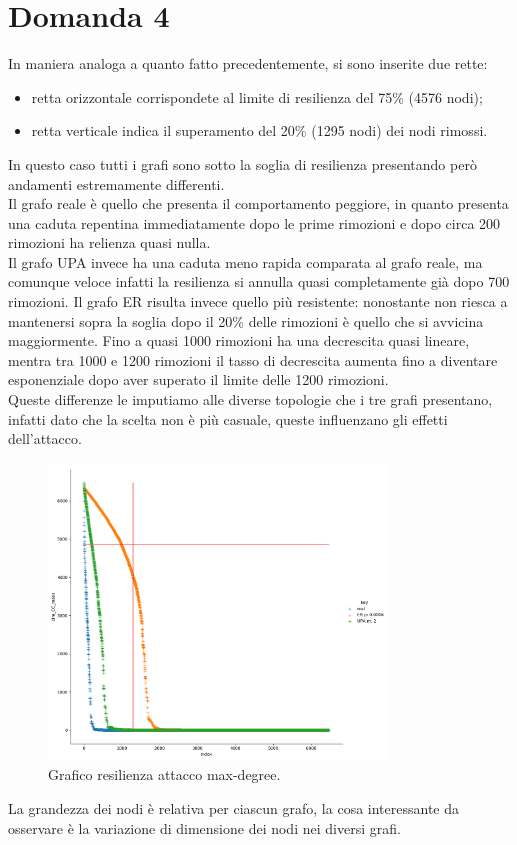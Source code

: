 \documentclass{article}
\begin{document}
\section*{Domanda 4}
In maniera analoga a quanto fatto precedentemente, si sono inserite due rette:
\begin{itemize}
	\item retta orizzontale corrispondete al limite di resilienza del 75\% (4576 nodi);
	\item retta verticale indica il superamento del 20\% (1295 nodi) dei nodi rimossi. 
\end{itemize}
In questo caso tutti i grafi sono sotto la soglia di resilienza presentando però andamenti estremamente differenti.\\
Il grafo reale è quello che presenta il comportamento peggiore, in quanto presenta una caduta repentina immediatamente dopo le prime rimozioni e dopo circa 200 rimozioni ha relienza quasi nulla.\\
Il grafo UPA invece ha una caduta meno rapida comparata al grafo reale, ma comunque veloce infatti la resilienza si annulla quasi completamente già dopo 700 rimozioni.
Il grafo ER risulta invece quello più resistente: nonostante non riesca a mantenersi sopra la soglia dopo il 20\% delle rimozioni è quello che si avvicina maggiormente. Fino a quasi 1000 rimozioni ha una decrescita quasi lineare, mentra tra 1000 e 1200 rimozioni il tasso di decrescita aumenta fino a diventare esponenziale dopo aver superato il limite delle 1200 rimozioni.\\
Queste differenze le imputiamo alle diverse topologie che i tre grafi presentano, infatti dato che la scelta non è più casuale, queste influenzano gli effetti dell'attacco.\\

\begin{figure}[H]
	\centering
	\includegraphics[width=0.80\textwidth]{figures/figure_maxdegree_line}
	\caption{Grafico resilienza attacco max-degree.}
\end{figure}
\newpage
\noindent La grandezza dei nodi è relativa per ciascun grafo, la cosa interessante da osservare è la variazione di dimensione dei nodi nei diversi grafi.
\end{document}
